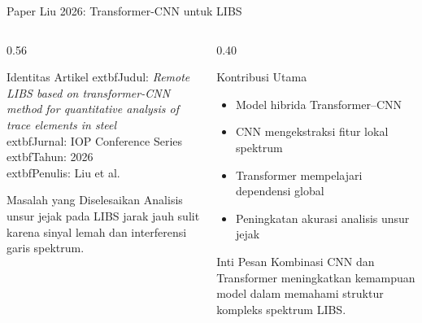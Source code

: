 \documentclass[aspectratio=169,10pt]{beamer}
\begin{document}
\begin{frame}{Paper Liu 2026: Transformer-CNN untuk LIBS}

\begin{columns}[T]

\begin{column}{0.56\textwidth}

\begin{block}{Identitas Artikel}
\small
	extbf{Judul}: \textit{Remote LIBS based on transformer-CNN method for quantitative analysis of trace elements in steel}\\[4pt]

	extbf{Jurnal}: IOP Conference Series\\
	extbf{Tahun}: 2026\\[4pt]

	extbf{Penulis}: Liu et al.
\end{block}

\begin{exampleblock}{Masalah yang Diselesaikan}
\small
Analisis unsur jejak pada LIBS jarak jauh sulit karena sinyal lemah dan interferensi garis spektrum.
\end{exampleblock}

\end{column}

\begin{column}{0.40\textwidth}

\begin{block}{Kontribusi Utama}
\small
\begin{itemize}
\item Model hibrida Transformer--CNN
\item CNN mengekstraksi fitur lokal spektrum
\item Transformer mempelajari dependensi global
\item Peningkatan akurasi analisis unsur jejak
\end{itemize}
\end{block}

\begin{alertblock}{Inti Pesan}
\small
Kombinasi CNN dan Transformer meningkatkan kemampuan model dalam memahami struktur kompleks spektrum LIBS.
\end{alertblock}

\end{column}

\end{columns}

\end{frame}
\end{document}
